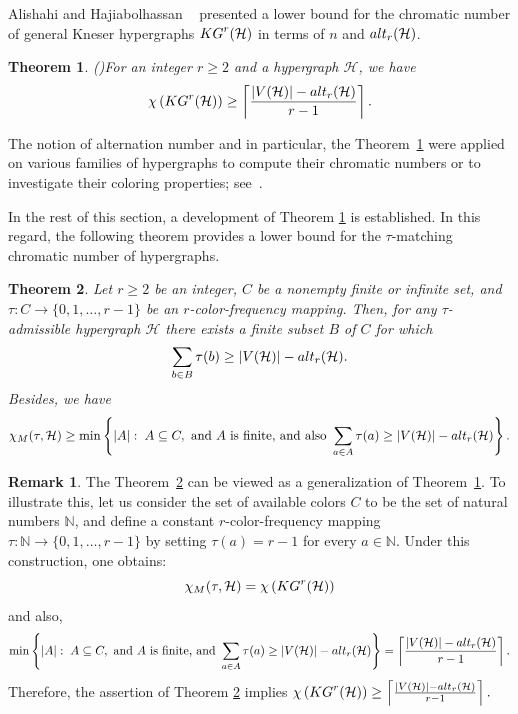 \documentclass[11pt]{amsart}
\newtheorem{theorem}{Theorem} %
\theoremstyle{definition}
\newtheorem{remark}{Remark}
\begin{document}
Alishahi and Hajiabolhassan ~\cite{2013arXiv1302.5394A} presented a lower bound for the chromatic number of general Kneser hypergraphs ${\rm KG}^r({\mathcal H})$ in terms of $n$ and ${\rm alt}_r({\mathcal H})$.
\begin{theorem}{\rm (\cite{2013arXiv1302.5394A})}\label{alihaji}
	For an integer $r\geq 2$ and a hypergraph ${\mathcal H}$, we have
	$$\chi\left({\rm KG}^r({\mathcal H})\right)\geq \left\lceil{ |V({\mathcal H})|-{\rm alt}_r({\mathcal H})\over r-1}\right\rceil.$$
\end{theorem}
The notion of alternation number and in particular, the Theorem~\ref{alihaji} were applied on various families of hypergraphs to compute their chromatic numbers or to investigate their coloring properties;
see~\cite{arsmc/SaniAT18,journals/combinatorics/Alishahi17,2013arXiv1302.5394A,2014arXiv1401.0138A,2014arXiv1403.4404A,jgt.22215,2014arXiv1407.8035A,Alishahi_Hossein_2020}.

In the rest of this section, a development of Theorem \ref{alihaji} is established. In this regard, the following theorem provides a lower bound for the $\tau$-matching chromatic number of hypergraphs.

\begin{theorem}\label{mainthmSaeed}
	Let $r\geq 2$ be an integer, $C$ be a nonempty finite or infinite set, and
	$\tau: C \longrightarrow \{0,1,\ldots,r-1\}$ be an $r$-color-frequency  mapping.
	Then, for any $\tau$-admissible hypergraph ${\mathcal H}$ there exists a finite subset
	$B$ of $C$ for which
	$$\sum_{b\in B}\tau(b) \geq  |V({\mathcal H})|-{\rm alt}_r({\mathcal H}) .$$
	Besides, we have
	$$\chi_M(\tau,{\mathcal H})\geq \min \left\{|A|:\;   A \subseteq C, \mbox{ and } A \mbox{ is finite,}  \mbox{ and also } \sum_{a\in A}\tau(a) \geq  |V({\mathcal H})|-{\rm alt}_r({\mathcal H})\right\}.$$
\end{theorem}

\begin{remark}
	The Theorem~\ref{mainthmSaeed} can be viewed as a generalization of Theorem~\ref{alihaji}. To illustrate this, let us consider the set of available colors $C$ to be the set of natural numbers
	$\mathbb{N}$, and define a constant $r$-color-frequency mapping $\tau: \mathbb{N} \longrightarrow \{0,1,\ldots,r-1\}$ by setting $\tau(a) = r-1$ for every $a \in \mathbb{N}$. Under this construction, one obtains:
	$$\chi_M(\tau, {\mathcal H})=\chi\left({\rm KG}^r({\mathcal H})\right)$$
	and also,
	$$\min\left\{|A|:\;   A \subseteq C, \mbox{ and } A \mbox{ is finite,}  \mbox{ and } \sum_{a\in A}\tau(a) \geq  |V({\mathcal H})|-{\rm alt}_r({\mathcal H})\right\}=\left\lceil{ |V({\mathcal H})|-{\rm alt}_r({\mathcal H})\over r-1}\right\rceil.$$
	Therefore, the assertion of Theorem \ref{mainthmSaeed} implies 
	$\chi\left({\rm KG}^r({\mathcal H})\right)\geq \left\lceil{ |V({\mathcal H})|-{\rm alt}_r({\mathcal H})\over r-1}\right\rceil.$
\end{remark}
\end{document}
